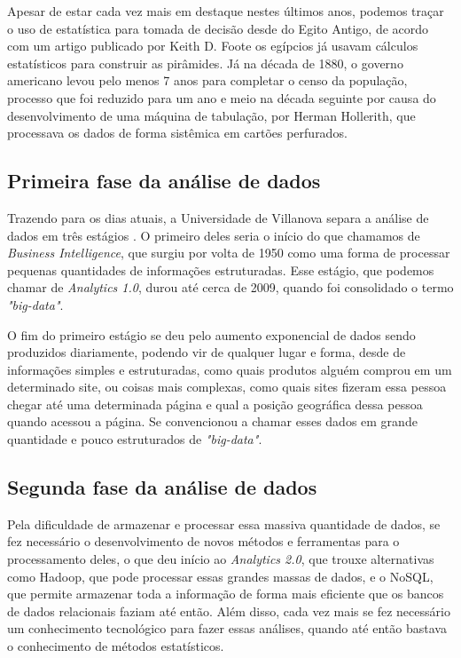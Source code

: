 \indent
\par Apesar de estar cada vez mais em destaque nestes últimos anos, podemos traçar o uso de estatística para tomada de decisão desde do Egito Antigo, de acordo com um artigo publicado por Keith D. Foote \cite{Foote2018} os egípcios já usavam cálculos estatísticos para construir as pirâmides. Já na década de 1880, o governo americano levou pelo menos 7 anos para completar o censo da população, processo que foi reduzido para um ano e meio na década seguinte por causa do desenvolvimento de uma máquina de tabulação, por Herman Hollerith, que processava os dados de forma sistêmica em cartões perfurados.

\subsection{Primeira fase da análise de dados}

\indent
\par Trazendo para os dias atuais, a Universidade de Villanova separa a análise de dados em três estágios \cite{Villanova}. O primeiro deles seria o início do que chamamos de \textit{Business Intelligence}, que surgiu por volta de 1950 como uma forma de processar pequenas quantidades de informações estruturadas. Esse estágio, que podemos chamar de \textit{Analytics 1.0}, durou até cerca de 2009, quando foi consolidado o termo \textit{"big-data"}.

\par O fim do primeiro estágio se deu pelo aumento exponencial de dados sendo produzidos diariamente, podendo vir de qualquer lugar e forma, desde de informações simples e estruturadas, como quais produtos alguém comprou em um determinado site, ou coisas mais complexas, como quais sites fizeram essa pessoa chegar até uma determinada página e qual a posição geográfica dessa pessoa quando acessou a página. Se convencionou a chamar esses dados em grande quantidade e pouco estruturados de \textit{"big-data"}.

\subsection{Segunda fase da análise de dados}

\indent
\par Pela dificuldade de armazenar e processar essa massiva quantidade de dados, se fez necessário o desenvolvimento de novos métodos e ferramentas para o processamento deles, o que deu início ao \textit{Analytics 2.0}, que trouxe alternativas como Hadoop, que pode processar essas grandes massas de dados, e o NoSQL, que permite armazenar toda a informação de forma mais eficiente que os bancos de dados relacionais faziam até então. Além disso, cada vez mais se fez necessário um conhecimento tecnológico para fazer essas análises, quando até então bastava o conhecimento de métodos estatísticos.

